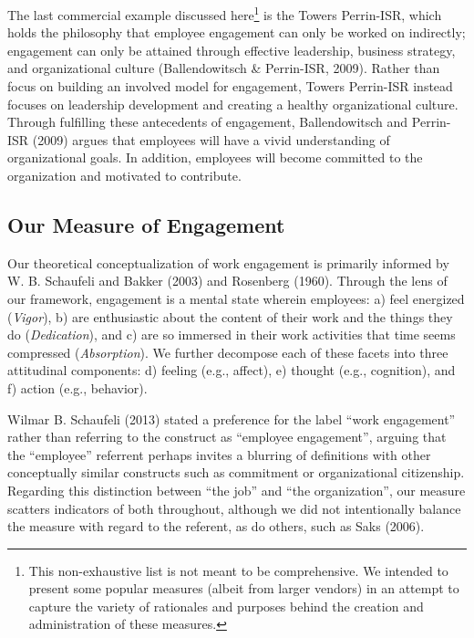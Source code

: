 \documentclass[
  man]{apa6}
\begin{document}
The last commercial example discussed here\footnote{This non-exhaustive list is not meant to be comprehensive. We intended to present some popular measures (albeit from larger vendors) in an attempt to capture the variety of rationales and purposes behind the creation and administration of these measures.} is the Towers Perrin-ISR, which holds the philosophy that employee engagement can only be worked on indirectly; engagement can only be attained through effective leadership, business strategy, and organizational culture (Ballendowitsch \& Perrin-ISR, 2009). Rather than focus on building an involved model for engagement, Towers Perrin-ISR instead focuses on leadership development and creating a healthy organizational culture. Through fulfilling these antecedents of engagement, Ballendowitsch and Perrin-ISR (2009) argues that employees will have a vivid understanding of organizational goals. In addition, employees will become committed to the organization and motivated to contribute.

\hypertarget{our-measure-of-engagement}{%
\subsection{Our Measure of Engagement}\label{our-measure-of-engagement}}

Our theoretical conceptualization of work engagement is primarily informed by W. B. Schaufeli and Bakker (2003) and Rosenberg (1960). Through the lens of our framework, engagement is a mental state wherein employees: a) feel energized (\emph{Vigor}), b) are enthusiastic about the content of their work and the things they do (\emph{Dedication}), and c) are so immersed in their work activities that time seems compressed (\emph{Absorption}). We further decompose each of these facets into three attitudinal components: d) feeling (e.g., affect), e) thought (e.g., cognition), and f) action (e.g., behavior).

Wilmar B. Schaufeli (2013) stated a preference for the label ``work engagement'' rather than referring to the construct as ``employee engagement'', arguing that the ``employee'' referrent perhaps invites a blurring of definitions with other conceptually similar constructs such as commitment or organizational citizenship. Regarding this distinction between ``the job'' and ``the organization'', our measure scatters indicators of both throughout, although we did not intentionally balance the measure with regard to the referent, as do others, such as Saks (2006).
\end{document}
